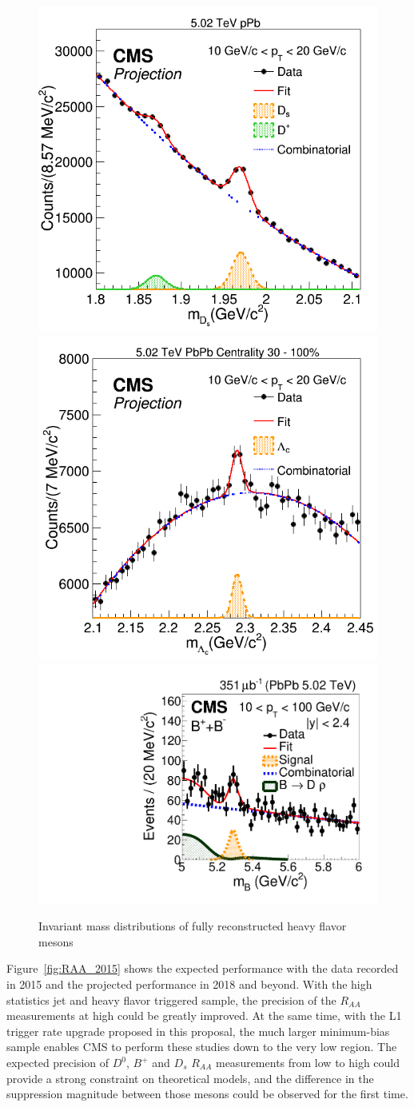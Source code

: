 \begin{figure}[!ht]
\begin{center}
\includegraphics[width=.32\textwidth]{InvMassFigures/Ds.png}
\includegraphics[width=.32\textwidth]{InvMassFigures/LambdaC.png}
\includegraphics[width=.335\textwidth]{InvMassFigures/BtoDpi_data_PbPb_10_100.pdf}
\caption{Invariant mass distributions of fully reconstructed heavy flavor mesons}
\label{fig:HFMesonMass}
\end{center}
\end{figure}

Figure~\ref{fig:RAA_2015} shows the expected performance with the data recorded in 2015 and the projected performance in 2018 and beyond. With the high statistics jet and heavy flavor triggered sample, the precision of the $R_{AA}$ measurements at high \pt could be greatly improved. At the same time, with the L1 trigger rate upgrade proposed in this proposal, the much larger minimum-bias sample enables CMS to perform these studies down to the very low \pt region. The expected precision of $D^0$, $B^+$ and $D_s$ $R_{AA}$ measurements from low \pt to high \pt could provide a strong constraint on theoretical models, and the difference in the suppression magnitude between those mesons could be observed for the first time.



